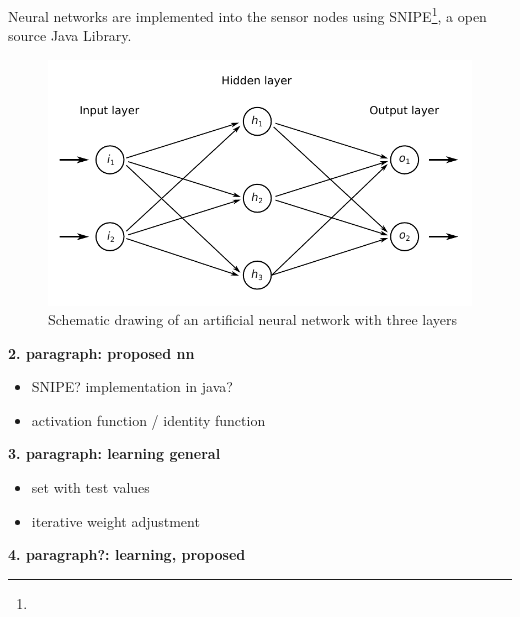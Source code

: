 \documentclass[12pt,a4paper]{scrartcl}
\begin{document}
	Neural networks are implemented into the sensor nodes using SNIPE\footnote{}, a open source Java Library.
	\begin{figure}[ht]
		\centering
		\includegraphics{figures/neuralnetwork.pdf}
		\caption{Schematic drawing of an artificial neural network with three layers}
		\label{fig:neuralnetwork}
	\end{figure}
	
	
	
	\textbf{2. paragraph: proposed nn}
	
	\begin{itemize}
		\item SNIPE? implementation in java?
		\item activation function / identity function
	\end{itemize}
	
	\textbf{3. paragraph: learning general}
	
	\begin{itemize}
		\item set with test values
		\item iterative weight adjustment
	\end{itemize}
	
	\textbf{4. paragraph?: learning, proposed}
	
	
\end{document}

